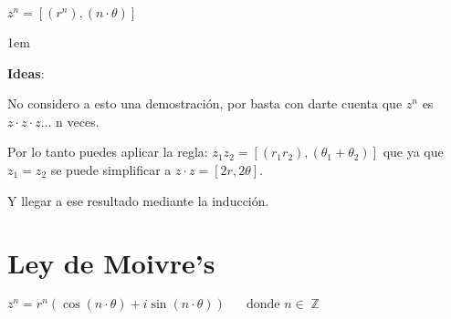 \documentclass[12pt, fleqn]{report}                             %
\newenvironment{SmallIndentation}[1][0.75em]                    %
    {\begin{adjustwidth}{#1}{}\begin{footnotesize}}                 %
    {\end{footnotesize}\end{adjustwidth}}                           %
\DeclareMathOperator \Space {\quad}                             %
\newcommand{\Wrap}[1]{\left( #1 \right)}                        %
\DeclareMathOperator \Integers  {\mathbb{Z}}                     %
\newcommand{\Cos}[1]{\cos\Wrap{#1}}
\newcommand{\Sin}[1]{\sin\Wrap{#1}}
\newcommand \Cis[1]  {\Cos{#1} + i \Sin{#1}}                    %
\begin{document}
\begin{itemize}
                    $z^n = [(r^n), (n \cdot \theta)]$

                    \begin{SmallIndentation}[1em]
                        \textbf{Ideas}:

                        No considero a esto una demostración, por basta con darte cuenta que
                        $z^n$ es $z \cdot z \cdot z \dots$ n veces.

                        Por lo tanto puedes aplicar la regla: $z_1z_2 = [(r_1r_2), (\theta_1 + \theta_2)]$
                        que ya que $z_1 = z_2$ se puede simplificar a $z \cdot z = [2r, 2\theta]$.

                        Y llegar a ese resultado mediante la inducción.

                    \end{SmallIndentation}

            \clearpage
            

            \end{itemize}


        \clearpage
        \section{Ley de Moivre's}

            $z^n = r^n \Wrap{\Cis{n \cdot \theta}} \Space \text{donde } n \in \Integers$
            
\end{document}
